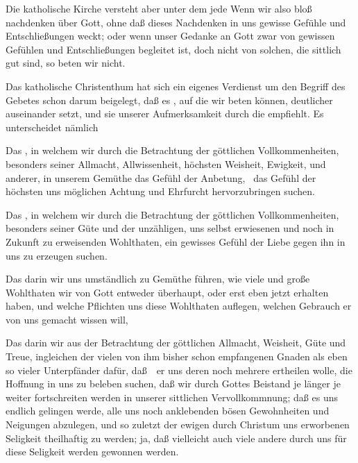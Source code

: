 \begin{aufza}
\item Die katholische Kirche versteht aber unter dem  jede  Wenn wir also bloß nachdenken über Gott, ohne daß dieses Nachdenken in uns gewisse Gefühle und Entschließungen weckt; oder wenn unser Gedanke an Gott zwar von gewissen Gefühlen und Entschließungen begleitet ist, doch nicht von solchen, die sittlich gut sind, so beten wir nicht.
\item Das katholische Christenthum hat sich ein eigenes Verdienst um den Begriff des Gebetes schon darum beigelegt, daß es , auf die wir beten können, deutlicher auseinander setzt, und sie unserer Aufmerksamkeit durch die  empfiehlt. Es unterscheidet nämlich
\begin{aufzb}
\item Das , in welchem wir durch die Betrachtung der göttlichen Vollkommenheiten, besonders seiner Allmacht, Allwissenheit, höchsten Weisheit, Ewigkeit, und anderer, in unserem Gemüthe das Gefühl der Anbetung, \dh\  das Gefühl der höchsten uns möglichen Achtung und Ehrfurcht hervorzubringen suchen.
\item Das , in welchem wir durch die Betrachtung der göttlichen Vollkommenheiten, besonders seiner Güte und der unzähligen, uns selbst erwiesenen und noch in Zukunft zu erweisenden Wohlthaten, ein gewisses Gefühl der Liebe gegen ihn in uns zu erzeugen suchen.
\item Das  darin wir uns umständlich zu Gemüthe führen, wie viele und große Wohlthaten wir von Gott entweder überhaupt, oder erst eben jetzt erhalten haben, und welche Pflichten uns diese Wohlthaten auflegen, welchen Gebrauch er von uns gemacht wissen will, \usw\
\item Das  darin wir aus der Betrachtung der göttlichen Allmacht, Weisheit, Güte und Treue, ingleichen der vielen von ihm bisher schon empfangenen Gnaden als eben so vieler Unterpfänder dafür, daß~\ er uns deren noch mehrere ertheilen wolle, die Hoffnung in uns zu beleben suchen, daß wir durch Gottes Beistand je länger je weiter fortschreiten werden in unserer sittlichen Vervollkommnung; daß es uns endlich gelingen werde, alle uns noch anklebenden bösen Gewohnheiten und Neigungen abzulegen, und so zuletzt der ewigen durch Christum uns erworbenen Seligkeit theilhaftig zu werden; ja, daß vielleicht auch viele andere durch uns für diese Seligkeit werden gewonnen werden.

\end{aufzb}
\end{aufza}
